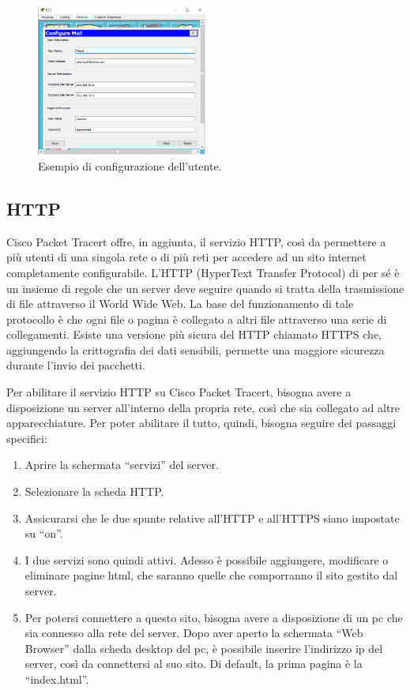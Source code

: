 \begin{figure}[h]
    \centering
    \includegraphics[width=0.5\textwidth]{images/06.03.02.png}
    \caption{Esempio di configurazione dell’utente.}
    \label{fig:email-conf-client}
\end{figure}

\subsection{HTTP}
Cisco Packet Tracert offre, in aggiunta, il servizio HTTP, così da permettere a più utenti di una singola rete o di più reti per accedere ad un sito internet completamente configurabile. L’HTTP (HyperText Transfer Protocol) di per sé è un insieme di regole che un server deve seguire quando si tratta della trasmissione di file attraverso il World Wide Web. La base del funzionamento di tale protocollo è che ogni file o pagina è collegato a altri file attraverso una serie di collegamenti. Esiste una versione più sicura del HTTP chiamato HTTPS che, aggiungendo la crittografia dei dati sensibili, permette una maggiore sicurezza durante l’invio dei pacchetti.

Per abilitare il servizio HTTP su Cisco Packet Tracert, bisogna avere a disposizione un server all’interno della propria rete, così che sia collegato ad altre apparecchiature. Per poter abilitare il tutto, quindi, bisogna seguire dei passaggi specifici:

\begin{enumerate}
    \item Aprire la schermata “servizi” del server.
    \item Selezionare la scheda HTTP.
    \item Assicurarsi che le due spunte relative all’HTTP e all’HTTPS siano impostate su “on”.
    \item I due servizi sono quindi attivi. Adesso è possibile aggiungere, modificare o eliminare pagine html, che saranno quelle che comporranno il sito gestito dal server.
    \item Per potersi connettere a questo sito, bisogna avere a disposizione di un pc che sia connesso alla rete del server. Dopo aver aperto la schermata “Web Browser” dalla scheda desktop del pc, è possibile inserire l’indirizzo ip del server, così da connettersi al suo sito. Di default, la prima pagina è la “index.html”.
\end{enumerate}

